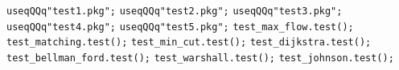 \label{src/lib/graph/test-all.pkg}
\verb|useqQQq"test1.pkg";|\newline
\verb|useqQQq"test2.pkg";|\newline
\verb|useqQQq"test3.pkg";|\newline
\verb|useqQQq"test4.pkg";|\newline
\verb|useqQQq"test5.pkg";|\newline
\verb|test_max_flow.test();|\newline
\verb|test_matching.test();|\newline
\verb|test_min_cut.test();|\newline
\verb|test_dijkstra.test();|\newline
\verb|test_bellman_ford.test();|\newline
\verb|test_warshall.test();|\newline
\verb|test_johnson.test();|\newline

